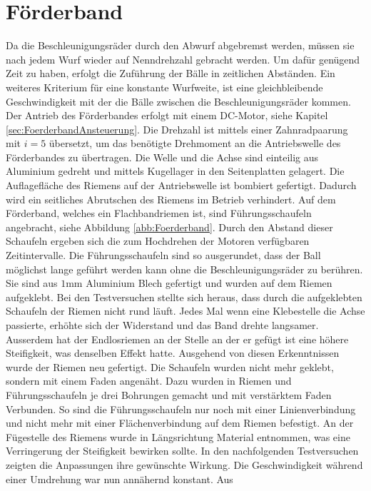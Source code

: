 \section{Förderband}
\label{sec:Foerderband}
	Da die Beschleunigungsräder durch den Abwurf abgebremst werden, müssen 
	sie nach jedem Wurf wieder auf Nenndrehzahl gebracht werden. Um dafür 
	genügend Zeit zu haben, erfolgt die Zuführung der Bälle in zeitlichen 
	Abständen. Ein weiteres Kriterium für eine konstante Wurfweite, ist eine 
	gleichbleibende Geschwindigkeit mit der die Bälle zwischen die 
	Beschleunigungsräder kommen. Der Antrieb des Förderbandes erfolgt mit 
	einem DC-Motor, siehe Kapitel \ref{sec:FoerderbandAnsteuerung}. Die 
	Drehzahl ist mittels einer Zahnradpaarung mit $i=5$ übersetzt, um das 
	benötigte Drehmoment an die Antriebswelle des Förderbandes zu übertragen. 
	Die Welle und die Achse sind einteilig aus Aluminium gedreht und mittels Kugellager in den Seitenplatten gelagert. 
	Die Auflagefläche des Riemens auf der Antriebswelle ist bombiert gefertigt. 
	Dadurch wird ein seitliches Abrutschen des Riemens im Betrieb verhindert. 
	Auf dem Förderband, welches ein Flachbandriemen ist, sind Führungsschaufeln 
	angebracht, siehe Abbildung \ref{abb:Foerderband}. Durch den Abstand dieser 
	Schaufeln ergeben sich die zum Hochdrehen der Motoren verfügbaren Zeitintervalle. Die Führungsschaufeln sind so 
	ausgerundet, dass der Ball möglichst lange geführt werden kann ohne die 
	Beschleunigungsräder zu berühren. Sie sind aus $1\si{\milli\meter}$ 
	Aluminium Blech gefertigt und wurden auf dem Riemen aufgeklebt. Bei den 
	Testversuchen stellte sich heraus, dass durch die aufgeklebten Schaufeln 
	der Riemen nicht rund läuft. Jedes Mal wenn eine Klebestelle die Achse 
	passierte, erhöhte sich der Widerstand und das Band drehte langsamer. 
	Ausserdem hat der Endlosriemen an der Stelle an der er gefügt ist eine 
	höhere Steifigkeit, was denselben Effekt hatte. Ausgehend von diesen 
	Erkenntnissen wurde der Riemen neu gefertigt. Die Schaufeln wurden nicht 
	mehr geklebt, sondern mit einem Faden angenäht. Dazu wurden in Riemen 
	und Führungsschaufeln je drei Bohrungen gemacht und mit verstärktem Faden 
	Verbunden. So sind die Führungsschaufeln nur noch mit einer Linienverbindung 
	und nicht mehr mit einer Flächenverbindung auf dem Riemen befestigt. An 
	der Fügestelle des Riemens wurde in Längsrichtung Material entnommen, was 
	eine Verringerung der Steifigkeit bewirken sollte. In den nachfolgenden 
	Testversuchen zeigten die Anpassungen ihre gewünschte Wirkung. Die 
	Geschwindigkeit während einer Umdrehung war nun annähernd konstant. Aus 
